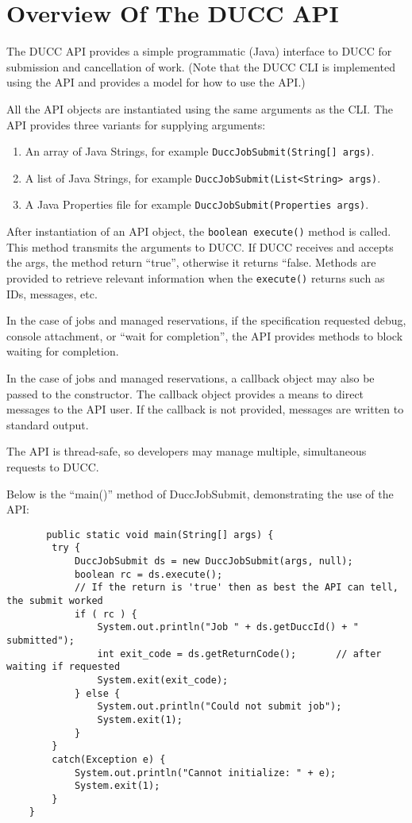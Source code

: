 \section{Overview Of The DUCC API}

   The DUCC API provides a simple programmatic (Java) interface to DUCC for submission and
   cancellation of work.  (Note that the DUCC CLI is implemented using the API and provides a
   model for how to use the API.)

   All the API objects are instantiated using the same arguments as the CLI.  The API
   provides three variants for supplying arguments:
   \begin{enumerate}
     \item An array of Java Strings, for example {\tt DuccJobSubmit(String[] args)}.
     \item A list of Java Strings,   for example {\tt DuccJobSubmit(List<String> args)}.
     \item A Java Properties file for example {\tt DuccJobSubmit(Properties args)}.
   \end{enumerate}

   After instantiation of an API object, the {\tt boolean execute()} method is called.  This
   method transmits the arguments to DUCC.  If DUCC receives and accepts the args, the method
   return ``true'', otherwise it returns ``false.  Methods are provided to retrieve relevant
   information when the {\tt execute()} returns such as IDs, messages, etc.

   In the case of jobs and managed reservations, if the specification requested debug,
   console attachment, or ``wait for completion'', the API provides methods to block
   waiting for completion.

   In the case of jobs and managed reservations, a callback object may also be passed to
   the constructor.  The callback object provides a means to direct messages to the
   API user.  If the callback is not provided, messages are written to standard output.

   The API is thread-safe, so developers may manage multiple, simultaneous requests to
   DUCC.

   Below is the ``main()'' method of DuccJobSubmit, demonstrating the use of the API:
\begin{verbatim}   
       public static void main(String[] args) {
        try {
            DuccJobSubmit ds = new DuccJobSubmit(args, null);
            boolean rc = ds.execute();
            // If the return is 'true' then as best the API can tell, the submit worked
            if ( rc ) {                
                System.out.println("Job " + ds.getDuccId() + " submitted");
                int exit_code = ds.getReturnCode();       // after waiting if requested
                System.exit(exit_code);
            } else {
                System.out.println("Could not submit job");
                System.exit(1);
            }
        }
        catch(Exception e) {
            System.out.println("Cannot initialize: " + e);
            System.exit(1);
        }
    }
\end{verbatim}

